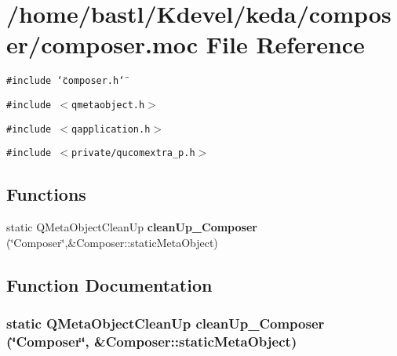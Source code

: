 \section{/home/bastl/Kdevel/keda/composer/composer.moc File Reference}
\label{composer_8moc}
{\tt \#include \char`\"{}composer.h\char`\"{}}\par
{\tt \#include $<$qmetaobject.h$>$}\par
{\tt \#include $<$qapplication.h$>$}\par
{\tt \#include $<$private/qucomextra\_\-p.h$>$}\par
\subsection*{Functions}
\begin{CompactItemize}
\item 
static QMeta\-Object\-Clean\-Up {\bf clean\-Up\_\-Composer} (\char`\"{}Composer\char`\"{},\&Composer::static\-Meta\-Object)
\end{CompactItemize}


\subsection{Function Documentation}
\subsubsection{\setlength{\rightskip}{0pt plus 5cm}static QMeta\-Object\-Clean\-Up clean\-Up\_\-Composer (\char`\"{}Composer\char`\"{}, \&Composer::static\-Meta\-Object)\hspace{0.3cm}{\tt  [static]}}\label{composer_8moc_7f714d58a376e6b25604c1a444043454}



